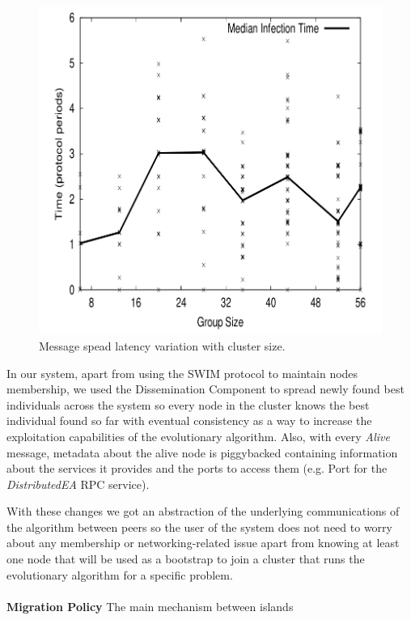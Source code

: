 \begin{figure}[h!]
		\centering
    	\includegraphics[scale=0.25]{assets/images/swim_chart.png}
    	\caption{Message spead latency variation with cluster size. \cite{SWIM}}
    	\label{image:web-milestone2}
\end{figure}

In our system, apart from using the SWIM protocol to maintain nodes membership, we used the Dissemination Component to spread newly found best individuals across the system so every node in the cluster knows the best individual found so far with eventual consistency as a way to increase the exploitation capabilities of the evolutionary algorithm. Also, with every \textit{Alive} message, metadata about the alive node is piggybacked containing information about the services it provides and the ports to access them (e.g. Port for the \textit{DistributedEA} RPC service).

With these changes we got an abstraction of the underlying communications of the algorithm between peers so the user of the system does not need to worry about any membership or networking-related issue apart from knowing at least one node that will be used as a bootstrap to join a cluster that runs the evolutionary algorithm for a specific problem.


\paragraph*{}
\textbf{Migration Policy}
The main mechanism between islands

